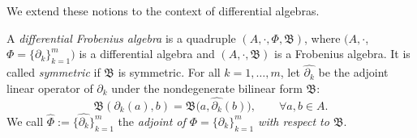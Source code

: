 \documentclass[pdftex]{sigma}
\numberwithin{equation}{section}
\begin{document}
We extend these notions to the context of differential algebras.
\begin{Definition}\label{def:differential_Frobenius_algebra}
 A \textit{differential Frobenius algebra} is a quadruple $(A, \cdot, \Phi, \mathfrak{B})$, where $(A, \cdot$, $\Phi = \{\partial_k\}_{k=1}^m)$ is a differential algebra
 and $(A, \cdot, \mathfrak{B})$ is a Frobenius algebra. It is
 called \textit{symmetric} if $\mathfrak B$ is symmetric.
 For all $k=1,\dots, m$, let $\hat{\partial_k}$ be the adjoint linear operator of $\partial_k$ under the nondegenerate bilinear form $\mathfrak{B}$:
 \begin{equation*}
 \mathfrak{B}(\partial_k(a), b) = \mathfrak{B}\big(a, \hat{\partial_k}(b)\big), \qquad
 \forall a, b \in A.
 \end{equation*}
 We call $\hat{\Phi} := \big\{\hat{\partial_k}\big\}_{k=1}^m$ the \textit{adjoint of $\Phi = \{\partial_k\}_{k=1}^m$ with respect to $\mathfrak B$}.
\end{Definition}
\end{document}
